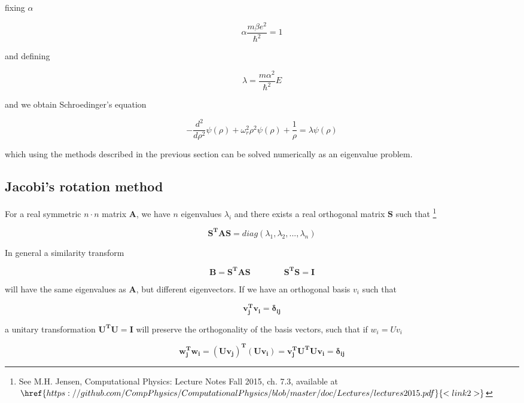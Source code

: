 \documentclass[%
 reprint,
 nobalancelastpage,
 amsmath,amssymb,
 aps,
]{revtex4-1}
\newcommand{\ddrhosq}{\frac{d^{2}}{d\rho^{2}}}
\begin{document}
fixing $\alpha$

\begin{equation}
	\alpha \frac{m \beta e^{2}}{\hbar^{2}} = 1
\end{equation}

and defining

\begin{equation}
	\lambda = \frac{m\alpha^{2}}{\hbar^{2}} E
\end{equation}

and we obtain Schroedinger's equation

\begin{equation}
	-\ddrhosq \psi(\rho) + \omega_{r}^{2}\rho^{2}\psi(\rho) + \frac{1}{\rho} = \lambda \psi(\rho)
\end{equation}

which using the methods described in the previous section can be solved numerically as an eigenvalue problem.

\subsection{Jacobi's rotation method}
For a real symmetric $n\cdot n$ matrix $\bm{A}$, we have $n$ eigenvalues $\lambda_{i}$ and there exists a real orthogonal matrix $\bm{S}$ such that 
\footnote{See M.H. Jensen, Computational Physics: Lecture Notes Fall 2015, ch. 7.3, available at $\href{https://github.com/CompPhysics/ComputationalPhysics/blob/master/doc/Lectures/lectures2015.pdf}{<link2>}$}

\begin{equation}
	\bm{S^{T}AS} = diag(\lambda_{1}, \lambda_{2},...,\lambda_{n})
\end{equation}

In general a similarity transform

\begin{equation}
	\bm{B = S^{T}AS} \qquad \qquad \bm{S^{T}S = I}
\end{equation}

will have the same eigenvalues as $\bm{A}$, but different eigenvectors. If we have an orthogonal basis $v_{i}$ such that

\begin{equation}
	\bm{v_{j}^{T}v_{i} = \delta_{ij}}
\end{equation}

a unitary transformation $\bm{U^{T}U = I}$ will preserve the orthogonality of the basis vectors, such that if $w_{i} = Uv_{i}$

\begin{equation}
	\bm{w_{j}^{T}w_{i} = (Uv_{j})^{T}(Uv_{i}) = v_{j}^{T}U^{T}Uv_{i} = \delta_{ij}}
\end{equation}
\end{document}
